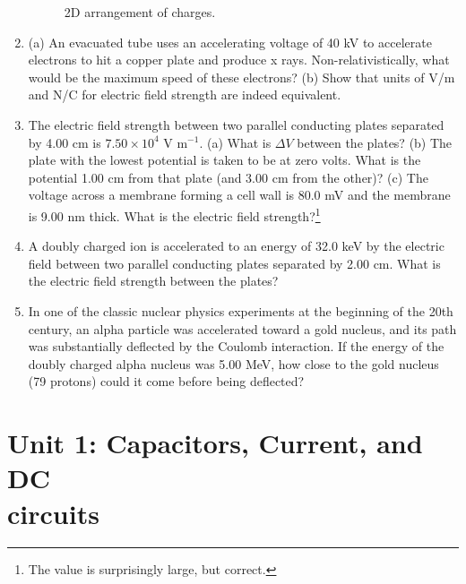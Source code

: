 \documentclass[12pt,twocolumn]{article}
\begin{document}
\begin{enumerate}
\begin{figure}[hb]
\caption{\label{fig:e-field_2} 2D arrangement of charges.}
\end{figure} \vspace{4cm}
\item (a) An evacuated tube uses an accelerating voltage of 40 kV to accelerate electrons to hit a copper plate and produce x rays. Non-relativistically, what would be the maximum speed of these electrons? (b)  Show that units of V/m and N/C for electric field strength are indeed equivalent. \\ \vspace{3cm}
\item The electric field strength between two parallel conducting plates separated by 4.00 cm is $7.50 \times 10^4$ V m$^{-1}$. (a) What is $\Delta V$ between the plates? (b) The plate with the lowest potential is taken to be at zero volts. What is the potential 1.00 cm from that plate (and 3.00 cm from the other)? (c) The voltage across a membrane forming a cell wall is 80.0 mV and the membrane is 9.00 nm thick. What is the electric field strength?\footnote{The value is surprisingly large, but correct.} \\ \vspace{4cm}
\item A doubly charged ion is accelerated to an energy of 32.0 keV by the electric field between two parallel conducting plates separated by 2.00 cm. What is the electric field strength between the plates? \\ \vspace{2cm}
\item In one of the classic nuclear physics experiments at the beginning of the 20th century, an alpha particle was accelerated toward a gold nucleus, and its path was substantially deflected by the Coulomb interaction. If the energy of the doubly charged alpha nucleus was 5.00 MeV, how close to the gold nucleus (79 protons) could it come before being deflected? \\ \vspace{3cm}
\end{enumerate}

\section{Unit 1: Capacitors, Current, and DC \\ circuits}
\end{document}
